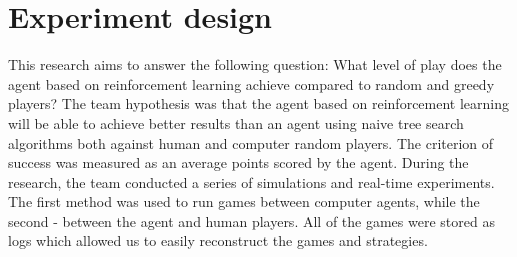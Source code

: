 \section{Experiment design}
This research aims to answer the following question:
What level of play does the agent based on reinforcement learning achieve compared to random and greedy players?
The team hypothesis was that the agent based on reinforcement learning will be 
able to achieve better results than an agent using naive tree search algorithms 
both against human and computer random players. The criterion of success was 
measured as an average points scored by the agent.
During the research, the team conducted a series of simulations and real-time experiments. 
The first method was used to run games between computer agents, while the second 
- between the agent and human players.  All of the games were stored as logs 
which allowed us to easily reconstruct the games and strategies.


